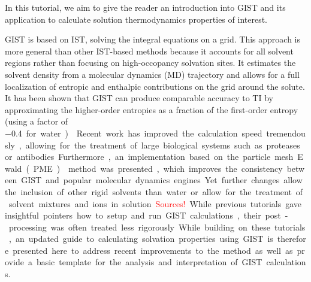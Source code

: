 \documentclass[9pt,tutorial]{livecoms}
\newcommand{\todo}{\textcolor{red}}
\begin{document}
In this tutorial, we aim to give the reader an introduction into GIST and its application to calculate solution thermodynamics properties of interest. 

GIST is based on IST, solving the integral equations on a grid. 
This approach is more general than other IST-based methods because it accounts for all solvent regions rather than focusing on high-occopancy solvation sites.
It estimates the solvent density from a molecular dynamics (MD) trajectory and allows for a full localization of entropic and enthalpic contributions on the grid around the solute.
It has been shown that GIST can produce comparable accuracy to TI by approximating the higher-order entropies as a fraction of the first-order entropy (using a factor of \SI{-0.4} for water) \cite{Chen2021,Waibl2022-gist-solvents}.

Recent work has improved the calculation speed tremendously, allowing for the treatment of large biological systems such as proteases or antibodies.
Furthermore, an implementation based on the particle mesh Ewald (PME) \cite{Darden1993-pme} method was presented, which improves the consistency between GIST and popular molecular dynamics engines. 
Yet further changes allow the inclusion of other rigid solvents than water or 
allow for the treatment of solvent mixtures and ions in solution. 
\todo{Sources!}

While previous tutorials gave insightful pointers how to setup and run GIST calculations, their post-processing was often treated less rigorously. While building on these tutorials, an updated guide to calculating solvation properties using GIST is therefore presented here to address recent improvements to the method as well as provide a basic template for the analysis and interpretation of GIST calculations.
\end{document}
